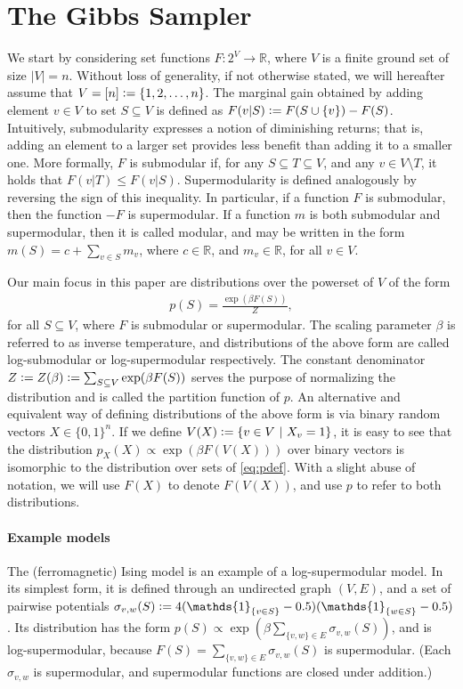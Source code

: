\section{The Gibbs Sampler} \label{sect:setup}
We start by considering set functions $F : 2^V \to \mathbb{R}$, where $V$ is a finite ground set of size $|V| = n$.
Without loss of generality, if not otherwise stated, we will hereafter assume that $V = [n] \vcentcolon= \{1, 2, \ldots,n\}$.
The marginal gain obtained by adding element $v \in V$ to set $S \subseteq V$ is defined as $F(v|S) \vcentcolon= F(S \cup \{v\}) - F(S)$.
Intuitively, submodularity expresses a notion of diminishing returns; that is, adding an element to a larger set provides less benefit than adding it to a smaller one.
More formally, $F$ is submodular if, for any $S \subseteq T \subseteq V$, and any $v \in V \setminus T$, it holds that $F(v|T) \leq F(v|S)$.
Supermodularity is defined analogously by reversing the sign of this inequality.
In particular, if a function $F$ is submodular, then the function $-F$ is supermodular.
If a function $m$ is both submodular and supermodular, then it is called modular, and may be written in the form $m(S) = c + \sum_{v \in S} m_v$, where $c \in \mathbb{R}$, and $m_v \in \mathbb{R}$, for all $v \in V$.

Our main focus in this paper are distributions over the powerset of $V$ of the form
\begin{align}\label{eq:pdef}
p(S) = \frac{\exp(\beta F(S))}{Z},
\end{align}
for all $S \subseteq V$, where $F$ is submodular or supermodular.
The scaling parameter $\beta$ is referred to as inverse temperature, and distributions of the above form are called log-submodular or log-supermodular respectively.
The constant denominator $Z \vcentcolon= Z(\beta) \vcentcolon= \sum_{S \subseteq V} \exp(\beta F(S))$ serves the purpose of normalizing the distribution and is called the partition function of $p$.
An alternative and equivalent way of defining distributions of the above form is via binary random vectors $X \in \{0, 1\}^n$.
If we define $V(X) \vcentcolon= \left\{v \in V\ \middle\vert\  X_v = 1\right\}$, it is easy to see that the distribution $p_X(X) \propto \exp(\beta F(V(X)))$ over binary vectors is isomorphic to the distribution over sets of \eqref{eq:pdef}.
With a slight abuse of notation, we will use $F(X)$ to denote $F(V(X))$, and use $p$ to refer to both distributions.

\paragraph{Example models}
The (ferromagnetic) Ising model is an example of a log-supermodular model.
In its simplest form, it is defined through an undirected graph $(V, E)$, and a set of pairwise potentials $\sigma_{v,w}(S) \defeq 4(\mathds{1}_{\{v \in S\}}-0.5)(\mathds{1}_{\{w \in S\}}-0.5)$.
Its distribution has the form $p(S) \propto \exp(\beta\sum_{\{v,w\} \in E} \sigma_{v,w}(S))$, and is log-supermodular, because $F(S) = \sum_{\{v,w\} \in E} \sigma_{v,w}(S)$ is supermodular. (Each $\sigma_{v,w}$ is supermodular, and supermodular functions are closed under addition.)

